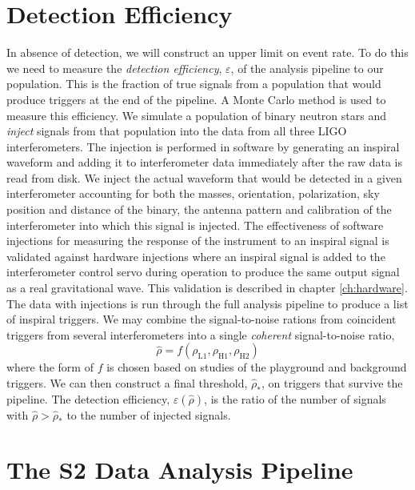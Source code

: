 \section{Detection Efficiency}
\label{s:eff}

In absence of detection, we will construct an upper limit on event rate.  To
do this we need to measure the \emph{detection efficiency}, $\varepsilon$, of
the analysis pipeline to our population. This is the fraction of true signals
from a population that would produce triggers at the end of the pipeline. A
Monte Carlo method is used to measure this efficiency. We simulate a
population of binary neutron stars and \emph{inject} signals from that
population into the data from all three LIGO interferometers. The injection is
performed in software by generating an inspiral waveform and adding it to
interferometer data immediately after the raw data is read from disk. We
inject the actual waveform that would be detected in a given interferometer
accounting for both the masses, orientation, polarization, sky position and
distance of the binary, the antenna pattern and calibration of the
interferometer into which this signal is injected.  The effectiveness of
software injections for measuring the response of the instrument to an
inspiral signal is validated against hardware injections where an inspiral
signal is added to the interferometer control servo during operation to
produce the same output signal as a real gravitational wave. This validation
is described in chapter \ref{ch:hardware}. The data with injections is run
through the full analysis pipeline to produce a list of inspiral triggers.
We may combine the signal-to-noise rations from coincident triggers from
several interferometers into a single \emph{coherent} signal-to-noise ratio,
\begin{equation}
\hat{\rho} = f(\rho_\mathrm{L1},\rho_\mathrm{H1},\rho_\mathrm{H2})
\end{equation}
where the form of $f$ is chosen based on studies of the playground and
background triggers. We can then construct a final threshold,
$\hat{\rho}_\ast$, on triggers that survive the pipeline. The detection
efficiency, $\varepsilon(\hat{\rho})$, is the ratio of the number of signals
with $\hat{\rho} > \hat{\rho}_\ast$  to the number of injected signals.

\section{The S2 Data Analysis Pipeline}
\label{s:s2pipeline}

